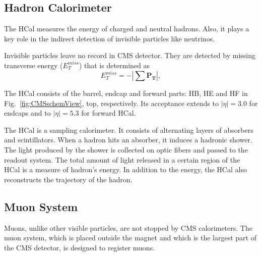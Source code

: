 
\subsection{Hadron Calorimeter}

The HCal measures the energy of charged and neutral hadrons. Also, it plays a key role in the indirect detection of invisible particles like neutrinos. 

Invisible particles leave no record in CMS detector. They are detected by missing transverse energy ($E_T^{miss}$) that is determined as 
\begin{equation}\label{eq:MET}
  E_T^{miss} = - | \sum \mathbf{P_T} |,
\end{equation}

The HCal consists of the barrel, endcap and forward parts: HB, HE and HF in Fig.~\ref{fig:CMSschemView}, top, respectively. Its acceptance extends to $|\eta|=3.0$ for endcaps and to $|\eta|=5.3$ for forward HCal.

The HCal is a sampling calorimeter. It consists of alternating layers of absorbers and scintillators. When a hadron hits an absorber, it induces a hadronic shower. The light produced by the shower is collected on optic fibers and passed to the readout system. The total amount of light released in a certain region of the HCal is a measure of hadron's energy. In addition to the energy, the HCal also reconstructs the trajectory of the hadron.   

\subsection{Muon System}

Muons, unlike other visible particles, are not stopped by CMS calorimeters. The muon system, which is placed outside the magnet and which is the largest part of the CMS detector, is designed to register muons.

